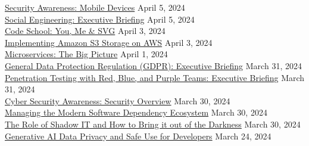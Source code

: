\documentclass[10pt]{res} %
\begin{document}
\begin{resume}
\href{https://bjdelacruz.dev/files/certificates/pluralsight/Security_Awareness_-_Mobile_Devices.pdf}{\color{blue}Security Awareness: Mobile Devices} \hfill April 5, 2024 \\
\href{https://bjdelacruz.dev/files/certificates/pluralsight/Social_Engineering_-_Executive_Briefing.pdf}{\color{blue}Social Engineering: Executive Briefing} \hfill April 5, 2024 \\
\href{https://bjdelacruz.dev/files/certificates/pluralsight/Code_School_-_You_Me_and_SVG.pdf}{\color{blue}Code School: You, Me \& SVG} \hfill April 3, 2024 \\
\href{https://bjdelacruz.dev/files/certificates/pluralsight/Implementing_Amazon_S3_Storage_on_AWS.pdf}{\color{blue}Implementing Amazon S3 Storage on AWS} \hfill April 3, 2024 \\
\href{https://bjdelacruz.dev/files/certificates/pluralsight/Microservices_-_The_Big_Picture.pdf}{\color{blue}Microservices: The Big Picture} \hfill April 1, 2024 \\
\href{https://bjdelacruz.dev/files/certificates/pluralsight/General_Data_Protection_Regulation_-_Executive_Briefing.pdf}{\color{blue}General Data Protection Regulation (GDPR): Executive Briefing} \hfill March 31, 2024 \\
\href{https://bjdelacruz.dev/files/certificates/pluralsight/Penetration_Testing_with_Red_Blue_and_Purple_Teams_-_Executive_Briefing.pdf}{\color{blue}Penetration Testing with Red, Blue, and Purple Teams: Executive Briefing} \hfill March 31, 2024 \\
\href{https://bjdelacruz.dev/files/certificates/pluralsight/Cyber_Security_Awareness_-_Security_Overview.pdf}{\color{blue}Cyber Security Awareness: Security Overview} \hfill March 30, 2024 \\
\href{https://bjdelacruz.dev/files/certificates/pluralsight/Managing_the_Modern_Software_Dependency_Ecosystem.pdf}{\color{blue}Managing the Modern Software Dependency Ecosystem} \hfill March 30, 2024 \\
\href{https://bjdelacruz.dev/files/certificates/pluralsight/The_Role_of_Shadow_IT_and_How_to_Bring_it_out_of_the_Darkness.pdf}{\color{blue}The Role of Shadow IT and How to Bring it out of the Darkness} \hfill March 30, 2024 \\
\href{https://bjdelacruz.dev/files/certificates/pluralsight/Generative_AI_Data_Privacy_and_Safe_Use_for_Developers.pdf}{\color{blue}Generative AI Data Privacy and Safe Use for Developers} \hfill March 24, 2024 \\

\end{resume}
\end{document}
